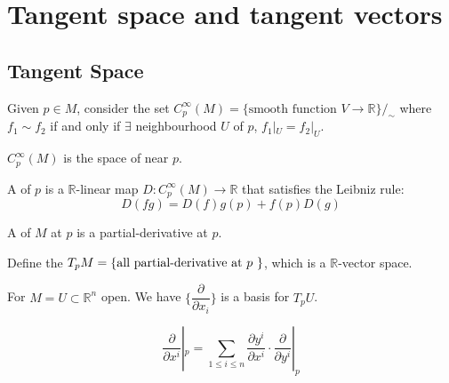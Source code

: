\section{Tangent space and tangent vectors}
\subsection{Tangent Space}
Given  $ p\in M  $, consider the set  $ C_p^\infty(M)=\{\text{smooth function } V\rightarrow \mathbb{R}\}/_\sim $ where  $ f_1\sim f_2 $ if and only if  $ \exists $ neighbourhood  $ U $ of  $ p $,  $ f_1|_U=f_2|_U $.

 $ C_p^\infty(M) $ is the space of  near  $ p $. 

 
A  of  $ p $ is a  $ \mathbb{R} $-linear map  $ D:C_p^\infty(M)\rightarrow \mathbb{R} $ that satisfies the Leibniz rule:
\[D(fg)=D(f)g(p)+f(p)D(g)\] 
\begin{definition}
    A  of  $ M  $ at  $ p  $ is a partial-derivative at  $ p $.
    
    Define the   $ T_pM=\{\text{all partial-derivative at  $ p $ }\} $, which is a  $ \mathbb{R} $-vector space.   
\end{definition}
\begin{proposition}
    For  $ M=U\subset \mathbb{R}^n $ open. We have  $ \{\dfrac{\partial }{\partial x_i}\} $ is a basis for  $ T_pU $.   
\end{proposition}
\begin{proposition}
    \[\frac{\partial }{\partial x^i}|_p=\sum\limits_{1 \leq i \leq n}\frac{\partial y^i}{\partial x^i}\cdot \frac{\partial }{\partial y^i}|_p\]
\end{proposition}
